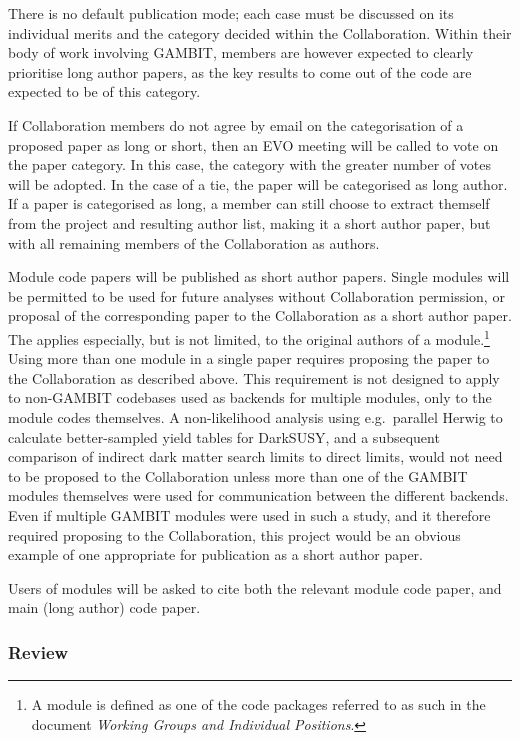 There is no default publication mode; each case must be discussed on its individual merits and the category decided within the Collaboration.  Within their body of work involving GAMBIT, members are however expected to clearly prioritise long author papers, as the key results to come out of the code are expected to be of this category.

If Collaboration members do not agree by email on the categorisation of a proposed paper as long or short, then an EVO meeting will be called to vote on the paper category.  In this case, the category with the greater number of votes will be adopted.  In the case of a tie, the paper will be categorised as long author.  If a paper is categorised as long, a member can still choose to extract themself from the project and resulting author list, making it a short author paper, but with all remaining members of the Collaboration as authors.

Module code papers will be published as short author papers.  Single modules will be permitted to be used for future analyses without Collaboration permission, or proposal of the corresponding paper to the Collaboration as a short author paper.  The applies especially, but is not limited, to the original authors of a module.\footnote{A module is defined as one of the code packages referred to as such in the document \textit{Working Groups and Individual Positions}.}  Using more than one module in a single paper requires proposing the paper to the Collaboration as described above.  This requirement is not designed to apply to non-GAMBIT codebases used as backends for multiple modules, only to the module codes themselves.  A non-likelihood analysis using e.g.\ parallel Herwig to calculate better-sampled yield tables for DarkSUSY, and a subsequent comparison of indirect dark matter search limits to direct limits, would not need to be proposed to the Collaboration unless more than one of the GAMBIT modules themselves were used for communication between the different backends.  Even if multiple GAMBIT modules were used in such a study, and it therefore required proposing to the Collaboration, this project would be an obvious example of one appropriate for publication as a short author paper.

Users of modules will be asked to cite both the relevant module code paper, and main (long author) code paper.

\subsubsection{Review}

